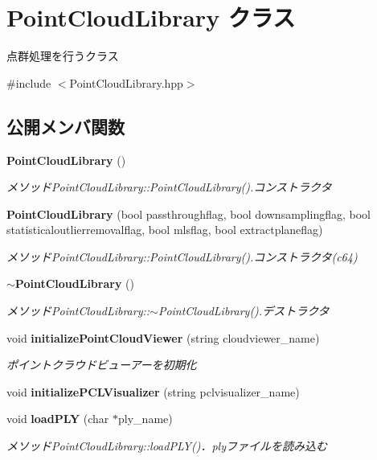 \section{Point\-Cloud\-Library クラス}
\label{class_point_cloud_library}


点群処理を行うクラス  




{\ttfamily \#include $<$Point\-Cloud\-Library.\-hpp$>$}

\subsection*{公開メンバ関数}
\begin{DoxyCompactItemize}
\item 
{\bf Point\-Cloud\-Library} ()
\begin{DoxyCompactList}\small\item\em メソッド\-Point\-Cloud\-Library\-::\-Point\-Cloud\-Library().コンストラクタ \end{DoxyCompactList}\item 
{\bf Point\-Cloud\-Library} (bool passthroughflag, bool downsamplingflag, bool statisticaloutlierremovalflag, bool mlsflag, bool extractplaneflag)
\begin{DoxyCompactList}\small\item\em メソッド\-Point\-Cloud\-Library\-::\-Point\-Cloud\-Library().コンストラクタ(c64) \end{DoxyCompactList}\item 
{\bf $\sim$\-Point\-Cloud\-Library} ()
\begin{DoxyCompactList}\small\item\em メソッド\-Point\-Cloud\-Library\-::$\sim$\-Point\-Cloud\-Library().デストラクタ \end{DoxyCompactList}\item 
void {\bf initialize\-Point\-Cloud\-Viewer} (string cloudviewer\-\_\-name)
\begin{DoxyCompactList}\small\item\em ポイントクラウドビューアーを初期化 \end{DoxyCompactList}\item 
void {\bf initialize\-P\-C\-L\-Visualizer} (string pclvisualizer\-\_\-name)
\item 
void {\bf load\-P\-L\-Y} (char $\ast$ply\-\_\-name)
\begin{DoxyCompactList}\small\item\em メソッド\-Point\-Cloud\-Library\-::load\-P\-L\-Y()．plyファイルを読み込む \end{DoxyCompactList}\item 

\end{DoxyCompactItemize}
